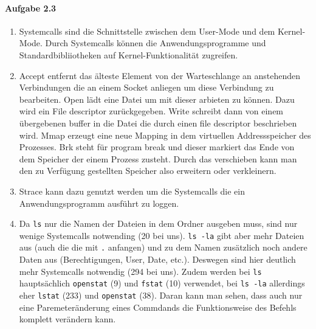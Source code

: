 \documentclass[11pt]{article}
\begin{document}
\paragraph{Aufgabe 2.3}
\begin{enumerate}[label = \alph*)]
\item Systemcalls sind die Schnittstelle zwischen dem User-Mode und dem Kernel-Mode. Durch Systemcalls können die Anwendungsprogramme und Standardbibliiotheken auf Kernel-Funktionalität zugreifen.

\item Accept entfernt das älteste Element von der Warteschlange an anstehenden Verbindungen die an einem Socket anliegen um diese Verbindung zu bearbeiten. Open lädt eine Datei um mit dieser arbieten zu können. Dazu wird ein File descriptor zurückgegeben. Write schreibt dann von einem übergebenen buffer in die Datei die durch einen file descriptor beschrieben wird. Mmap erzeugt eine neue Mapping in dem virtuellen Addressspeicher des Prozesses. Brk steht für program break und dieser markiert das Ende von dem Speicher der einem Prozess zusteht. Durch das verschieben kann man den zu Verfügung gestellten Speicher also erweitern oder verkleinern.

\item Strace kann dazu genutzt werden um die Systemcalls die ein Anwendungsprogramm ausführt zu loggen.

\item Da \verb|ls| nur die Namen der Dateien in dem Ordner ausgeben muss, sind nur wenige Systemcalls notwending (20 bei uns). \verb|ls -la| gibt aber mehr Dateien aus (auch die die mit \verb|.| anfangen) und zu dem Namen zusätzlich noch andere Daten aus (Berechtigungen, User, Date, etc.). Deswegen sind hier deutlich mehr Systemcalls notwendig (294 bei uns). Zudem werden bei \verb|ls| hauptsächlich \verb|openstat| (9) und \verb|fstat| (10) verwendet, bei \verb|ls -la| allerdings eher \verb|lstat| (233) und \verb|openstat| (38). Daran kann man sehen, dass auch nur eine Paremeteränderung eines Commdands die Funktionsweise des Befehls komplett verändern kann.
\end{enumerate}
\end{document}
